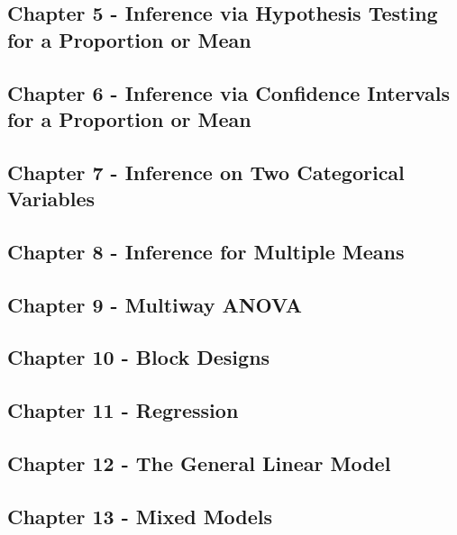 \documentclass[]{book}
\begin{document}
\subsection{Chapter 5 - Inference via Hypothesis Testing for a
Proportion or
Mean}\label{chapter-5---inference-via-hypothesis-testing-for-a-proportion-or-mean}

\subsection{Chapter 6 - Inference via Confidence Intervals for a
Proportion or
Mean}\label{chapter-6---inference-via-confidence-intervals-for-a-proportion-or-mean}

\subsection{Chapter 7 - Inference on Two Categorical
Variables}\label{chapter-7---inference-on-two-categorical-variables}

\subsection{Chapter 8 - Inference for Multiple
Means}\label{chapter-8---inference-for-multiple-means}

\subsection{Chapter 9 - Multiway
ANOVA}\label{chapter-9---multiway-anova}

\subsection{Chapter 10 - Block
Designs}\label{chapter-10---block-designs}

\subsection{Chapter 11 - Regression}\label{chapter-11---regression}

\subsection{Chapter 12 - The General Linear
Model}\label{chapter-12---the-general-linear-model}

\subsection{Chapter 13 - Mixed Models}\label{chapter-13---mixed-models}
\end{document}
